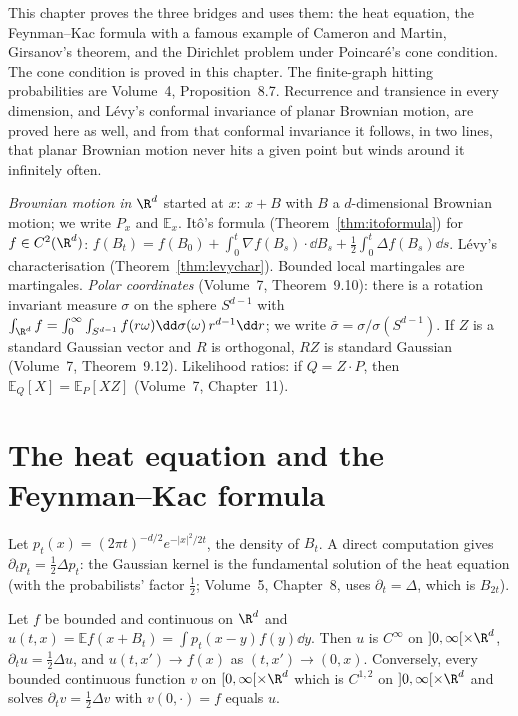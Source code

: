 This chapter proves the three bridges and uses them: the heat equation, the Feynman--Kac formula with a famous example of Cameron and Martin, Girsanov's theorem, and the Dirichlet problem under Poincar\'e's cone condition. The cone condition is proved in this chapter. The finite-graph hitting probabilities are Volume~4, Proposition~8.7. Recurrence and transience in every dimension, and L\'evy's conformal invariance of planar Brownian motion, are proved here as well, and from that conformal invariance it follows, in two lines,
that planar Brownian motion never hits a given point but winds around it infinitely often.

\begin{reminder}
\emph{Brownian motion in $\R^d$} started at $x$: $x+B$ with $B$ a $d$-dimensional Brownian motion; we write $P_x$ and $\mathbb E_x$. It\^o's formula (Theorem~\ref{thm:itoformula}) for $f\in C^2(\R^d)$:
$f(B_t)=f(B_0)+\int_0^t\nabla f(B_s)\cdot\dd B_s+\frac12\int_0^t\Delta f(B_s)\dd s$. L\'evy's characterisation (Theorem~\ref{thm:levychar}). Bounded local martingales are martingales. \emph{Polar coordinates}
(Volume~7, Theorem~9.10): there is a rotation invariant measure $\sigma$ on the sphere $S^{d-1}$ with $\int_{\R^d}f=\int_0^\infty\int_{S^{d-1}}f(r\omega)\dd\sigma(\omega)\,r^{d-1}\dd r$; we write $\bar\sigma=\sigma/\sigma(S^{d-1})$. If $Z$ is a
standard Gaussian vector and $R$ is orthogonal, $RZ$ is standard Gaussian (Volume~7, Theorem~9.12). Likelihood ratios: if $Q=Z\cdot P$, then $\mathbb E_Q[X]=\mathbb E_P[XZ]$ (Volume~7, Chapter~11).
\end{reminder}

\section{The heat equation and the Feynman--Kac formula}

Let $p_t(x)=(2\pi t)^{-d/2}e^{-|x|^2/2t}$, the density of $B_t$. A direct computation gives $\partial_tp_t=\frac12\Delta p_t$: the Gaussian kernel is the fundamental solution of the heat equation (with the
probabilists' factor $\frac12$; Volume~5, Chapter~8, uses $\partial_t=\Delta$, which is $B_{2t}$).

\begin{theorem}\label{thm:heat}
Let $f$ be bounded and continuous on $\R^d$ and $u(t,x)=\mathbb Ef(x+B_t)=\int p_t(x-y)f(y)\dd y$. Then $u$ is $C^\infty$ on $]0,\infty[\times\R^d$, $\partial_tu=\frac12\Delta u$, and $u(t,x')\to f(x)$ as
$(t,x')\to(0,x)$. Conversely, every bounded continuous function $v$ on $[0,\infty[\times\R^d$ which is $C^{1,2}$ on $]0,\infty[\times\R^d$ and solves $\partial_tv=\frac12\Delta v$ with $v(0,\cdot)=f$ equals $u$.
\end{theorem}

